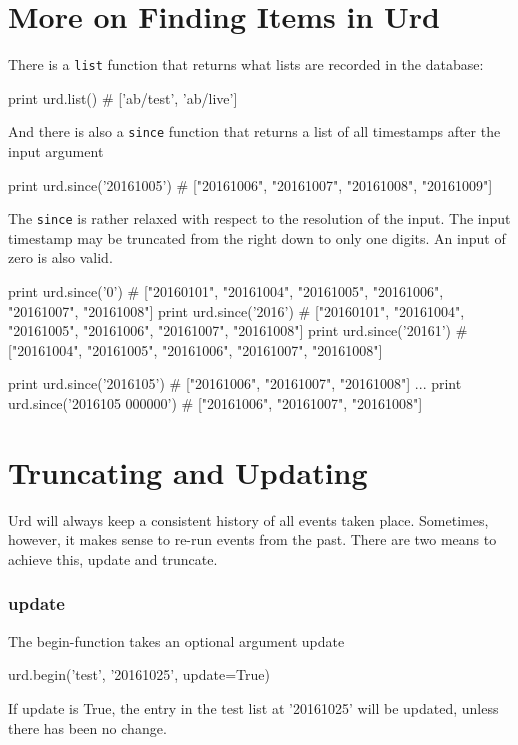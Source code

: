 \newpage
\section{More on Finding Items in Urd}
There is a \texttt{list} function that returns what lists are recorded
in the database:\\
\begin{pythonBEG}
  print urd.list()
  # ['ab/test', 'ab/live']
\end{pythonBEG}
And there is also a \texttt{since} function that returns a list of all
timestamps after the input argument\\
\begin{pythonMID}
  print urd.since('20161005')
  # ["20161006", "20161007", "20161008", "20161009"]
\end{pythonMID}
The \texttt{since} is rather relaxed with respect to the resolution of
the input.  The input timestamp may be truncated from the right down
to only one digits.  An input of zero is also valid.\\
\begin{pythonEND}
  print urd.since('0')
  # ["20160101", "20161004", "20161005", "20161006", "20161007", "20161008"]
  print urd.since('2016')
  # ["20160101", "20161004", "20161005", "20161006", "20161007", "20161008"]
  print urd.since('20161')
  # ["20161004", "20161005", "20161006", "20161007", "20161008"]

  print urd.since('2016105')
  # ["20161006", "20161007", "20161008"]
  ...
  print urd.since('2016105 000000')
  # ["20161006", "20161007", "20161008"]
\end{pythonEND}



\section{Truncating and Updating}

Urd will always keep a consistent history of all events taken place.
Sometimes, however, it makes sense to re-run events from the past.
There are two means to achieve this, update and truncate.

\subsubsection{update}
The begin-function takes an optional argument update

\begin{python}
  urd.begin('test', '20161025', update=True)
\end{python}
If update is True, the entry in the test list at '20161025' will be
updated, unless there has been no change.

